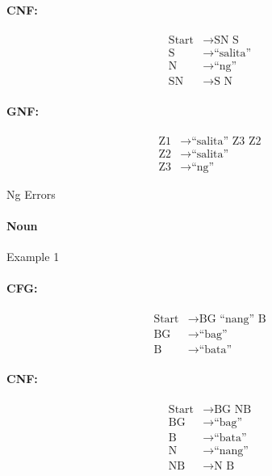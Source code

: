\paragraph{CNF:}
\begin{equation*}
    \begin{aligned}
        \text{Start}   & \rightarrow \text{SN S}   \\
        \text{S} & \rightarrow \text{“salita”} \\
        \text{N} & \rightarrow \text{“ng”} \\
        \text{SN} & \rightarrow \text{S N}
    \end{aligned}
\end{equation*}

\paragraph{GNF:}
\begin{equation*}
    \begin{aligned}
        \text{Z1}   & \rightarrow \text{“salita” Z3 Z2}   \\
        \text{Z2} & \rightarrow \text{“salita”} \\
        \text{Z3} & \rightarrow \text{“ng”}
    \end{aligned}
\end{equation*}

Ng Errors

\paragraph{Noun}
Example 1
\paragraph{CFG:}
\begin{equation*}
    \begin{aligned}
        \text{Start}   & \rightarrow \text{BG “nang” B}   \\
        \text{BG} & \rightarrow \text{“bag”} \\
        \text{B} & \rightarrow \text{“bata”}
    \end{aligned}
\end{equation*}

\paragraph{CNF:}
\begin{equation*}
    \begin{aligned}
        \text{Start}   & \rightarrow \text{BG NB}   \\
        \text{BG} & \rightarrow \text{“bag”} \\
        \text{B} & \rightarrow \text{“bata”} \\
        \text{N} & \rightarrow \text{“nang”} \\
        \text{NB} & \rightarrow \text{N B}
    \end{aligned}
\end{equation*}

